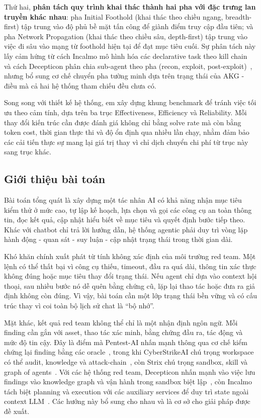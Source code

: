 Thứ hai, \textbf{phân tách quy trình khai thác thành hai pha với đặc trưng lan truyền khác nhau}: pha Initial Foothold (khai thác theo chiều ngang, breadth-first) tập trung vào độ phủ bề mặt tấn công để giành điểm truy cập đầu tiên; và pha Network Propagation (khai thác theo chiều sâu, depth-first) tập trung vào việc đi sâu vào mạng từ foothold hiện tại để đạt mục tiêu cuối. Sự phân tách này lấy cảm hứng từ cách Incalmo mô hình hóa các declarative task theo kill chain~\cite{incalmo} và cách Decepticon phân chia sub-agent theo pha (recon, exploit, post-exploit)~\cite{decepticon}, nhưng bổ sung cơ chế chuyển pha tường minh dựa trên trạng thái của AKG - điều mà cả hai hệ thống tham chiếu đều chưa có.

Song song với thiết kế hệ thống, em xây dựng khung benchmark để tránh việc tối ưu theo cảm tính, dựa trên ba trục Effectiveness, Efficiency và Reliability. Mỗi thay đổi kiến trúc cần được đánh giá không chỉ bằng solve rate mà còn bằng token cost, thời gian thực thi và độ ổn định qua nhiều lần chạy, nhằm đảm bảo các cải tiến thực sự mang lại giá trị thay vì chỉ dịch chuyển chi phí từ trục này sang trục khác.


\subsection{Giới thiệu bài toán}
\label{sec:gioi-thieu-bai-toan}

Bài toán tổng quát là xây dựng một tác nhân AI có khả năng nhận mục tiêu kiểm thử ở mức cao, tự lập kế hoạch, lựa chọn và gọi các công cụ an toàn thông tin, đọc kết quả, cập nhật hiểu biết về mục tiêu và quyết định bước tiếp theo. Khác với chatbot chỉ trả lời hướng dẫn, hệ thống agentic phải duy trì vòng lặp hành động - quan sát - suy luận - cập nhật trạng thái trong thời gian dài.

Khó khăn chính xuất phát từ tính không xác định của môi trường red team. Một lệnh có thể thất bại vì công cụ thiếu, timeout, đầu ra quá dài, thông tin xác thực không đúng hoặc mục tiêu thay đổi trạng thái. Nếu agent chỉ dựa vào context hội thoại, sau nhiều bước nó dễ quên bằng chứng cũ, lặp lại thao tác hoặc đưa ra giả định không còn đúng. Vì vậy, bài toán cần một lớp trạng thái bền vững và có cấu trúc thay vì coi toàn bộ lịch sử chat là ``bộ nhớ''.

Mặt khác, kết quả red team không thể chỉ là một nhận định ngôn ngữ. Mỗi finding cần gắn với asset, thao tác xác minh, bằng chứng đầu ra, tác động và mức độ tin cậy. Đây là điểm mà Pentest-AI nhấn mạnh thông qua cơ chế kiểm chứng lại finding bằng các oracle~\cite{pentestai}, trong khi CyberStrikeAI chú trọng workspace có thể audit, knowledge và attack-chain~\cite{cyberstrike}, còn Strix chú trọng sandbox, skill và graph of agents~\cite{strix}. Với các hệ thống red team, Decepticon nhấn mạnh vào việc lưu findings vào knowledge graph và vận hành trong sandbox biệt lập~\cite{decepticon}, còn Incalmo tách biệt planning và execution với các auxiliary services để duy trì state ngoài context LLM~\cite{incalmo}. Các hướng này bổ sung cho nhau và là cơ sở cho giải pháp được đề xuất.

